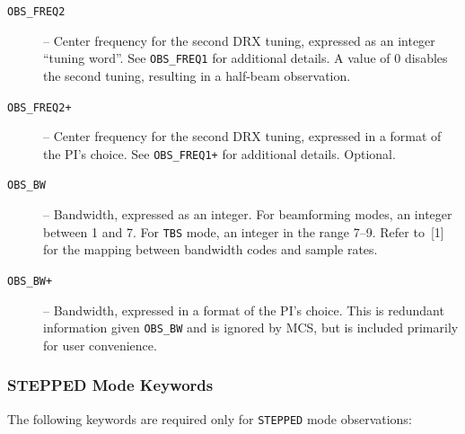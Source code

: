 \begin{description}
\item[\texttt{OBS\_FREQ2}] -- Center frequency for the second DRX tuning, expressed as an integer ``tuning word''.  See \texttt{OBS\_FREQ1} for additional details.  A value of 0 disables the second tuning, resulting in a half-beam observation.

\item[\texttt{OBS\_FREQ2+}] -- Center frequency for the second DRX tuning, expressed in a format of the PI's choice.  See \texttt{OBS\_FREQ1+} for additional details.  Optional.

\item[\texttt{OBS\_BW}] -- Bandwidth, expressed as an integer.  For beamforming modes, an integer between 1 and 7.  For \texttt{TBS} mode, an integer in the range 7--9.  Refer to~[1] for the mapping between bandwidth codes and sample rates.

\item[\texttt{OBS\_BW+}] -- Bandwidth, expressed in a format of the PI's choice.  This is redundant information given \texttt{OBS\_BW} and is ignored by MCS, but is included primarily for user convenience.
\end{description}

\subsubsection{STEPPED Mode Keywords}

The following keywords are required only for \texttt{STEPPED} mode observations:

